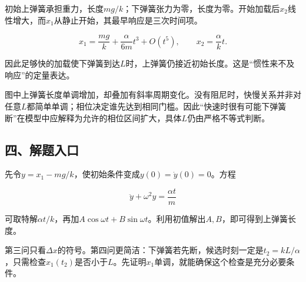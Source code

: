 \documentclass[12pt,a4paper,fontset=fandol]{ctexart}
\begin{document}
初始上弹簧承担重力，长度\(mg/k\)；下弹簧张力为零，长度为零。开始加载后\(x_2\)线性增大，而\(x_1\)从静止开始，其最早响应是三次时间项。

\[
x_1=\frac{mg}k+\frac{\alpha}{6m}t^3+O(t^5),
\qquad x_2=\frac{\alpha}k t.
\]

因此足够快的加载使下弹簧到达\(L\)时，上弹簧仍接近初始长度。这是``惯性来不及响应''的定量表达。

\begin{center}
\begin{minipage}{\linewidth}
\centering\begingroup{}
\ifdim\wd\diagrambox>.88\linewidth
\sbox{\diagrambox}{\resizebox{.88\linewidth}{!}{\usebox{\diagrambox}}}\fi
\ifdim\ht\diagrambox>.38\textheight
\resizebox{!}{.38\textheight}{\usebox{\diagrambox}}
\else\usebox{\diagrambox}\fi
\par{}\endgroup\end{minipage}\end{center}

图中上弹簧长度单调增加，却叠加有斜率周期变化。没有阻尼时，快慢关系并非对任意\(L\)都简单单调；相位决定谁先达到相同门槛。因此``快速时很有可能下弹簧断''在模型中应解释为允许的相位区间扩大，具体\(L\)仍由严格不等式判断。

\subsection{四、解题入口}\label{ux56dbux89e3ux9898ux5165ux53e3-4}

先令\(y=x_1-mg/k\)，使初始条件变成\(y(0)=\dot y(0)=0\)。方程

\[
\ddot y+\omega^2y=\frac{\alpha t}{m}
\]

可取特解\(\alpha t/k\)，再加\(A\cos\omega t+B\sin\omega t\)。利用初值解出\(A,B\)，即可得到上弹簧长度。

第三问只看\(\Delta x\)的符号。第四问更简洁：下弹簧若先断，候选时刻一定是\(t_2=kL/\alpha\)，只需检查\(x_1(t_2)\)是否小于\(L\)。先证明\(x_1\)单调，就能确保这个检查是充分必要条件。
\end{document}
